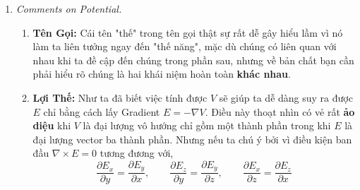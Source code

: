 \begin{enumerate}
Rõ ràng hiệu điện thế giữa hai điểm $a$ và $b$ sẽ là:
\begin{align*}
V(\mathbf{b}) - V(\mathbf{a})
&= \int_{\mathbf{O}}^{\mathbf{a}} E \cdot dI 
   - \int_{\mathbf{O}}^{\mathbf{b}} E \cdot dI \\
&= \int_{\mathbf{b}}^{\mathbf{O}} E \cdot dI 
   + \int_{\mathbf{O}}^{\mathbf{a}} E \cdot dI \\
&= -\int_{\mathbf{a}}^{\mathbf{b}} E \cdot dI .
\end{align*}

Mặt khác, theo định lý cơ bản của gradient:
\[
V(\mathbf{b}) - V(\mathbf{a}) 
= \int_{\mathbf{a}}^{\mathbf{b}} (\nabla V)\cdot dI .
\]

Vì vậy:
\[
\int_{\mathbf{a}}^{\mathbf{b}} (\nabla V)\cdot dI 
= -\int_{\mathbf{a}}^{\mathbf{b}} E \cdot dI .
\]

Điều này đúng với mọi $\mathbf{a},\mathbf{b}$ nên:
\[
E = -\nabla V.
\]
Phương trình trên chính là dạng vi phân của phương trình $V(\mathbf{r}) \equiv -\int_{\mathbf{O}}^{\mathbf{r}} E \cdot dI .$ Nó phát biểu rằng gradient của điện trường là một hàm thế vô hướng đúng như những gì ta muốn chứng minh.


Đừng để dấu trừ trong công thức làm bạn bối rối nó đơn giản chỉ là quy ước. Nhân tiện vai trò của việc tích phân độc lập với đường đi là cực kì quan trọng (tương đương với $\nabla \times E = 0$) vì nếu nó phụ thuộc vào đường đi thì định nghĩa của $V$ sẽ trở nên vô nghĩa.
\item \textit{Comments on Potential.}

\begin{enumerate}
\item \textbf{Tên Gọi:} Cái tên "thế" trong tên gọi thật sự rất dễ gây hiểu lầm vì nó làm ta liên tưởng ngay đến "thế năng", mặc dù chúng có liên quan với nhau khi ta đề cập đến chúng trong phần sau, nhưng về bản chất bạn cần phải hiểu rõ chúng là hai khái niệm hoàn toàn \textbf{khác nhau}.

\item \textbf{Lợi Thế:} Như ta đã biết việc tính được $V$ sẽ giúp ta dễ dàng suy ra được $E$ chỉ bằng cách lấy Gradient $E = -\nabla V$. Điều này thoạt nhìn có vẻ rất \textbf{ảo diệu} khi $V$ là đại lượng vô hướng chỉ gồm một thành phần trong khi $E$ là đại lượng vector ba thành phần. Nhưng nếu ta chú ý bởi vì điều kiện ban đầu $\nabla \times E = 0$ tương đương với,
\[
\frac{\partial{E_{x}}}{\partial{y}} = \frac{\partial{E_{y}}}{\partial{x}},
\qquad
\frac{\partial{E_{z}}}{\partial{y}} = \frac{\partial{E_{y}}}{\partial{z}},
\qquad
\frac{\partial{E_{x}}}{\partial{z}} = \frac{\partial{E_{z}}}{\partial{x}}
\]


\end{enumerate}
\end{enumerate}
